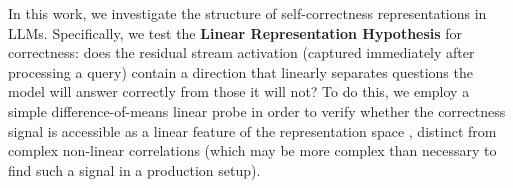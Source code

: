 \documentclass{article} %
\begin{document}
In this work, we investigate the structure of self-correctness representations in LLMs. Specifically, we test the \textbf{Linear Representation Hypothesis} for correctness: does the residual stream activation (captured immediately after processing a query) contain a direction that linearly separates questions the model will answer correctly from those it will not? To do this, we employ a simple difference-of-means linear probe in order to verify whether the correctness signal is accessible as a linear feature of the representation space \citep{park2024linearrepresentationhypothesisgeometry}, distinct from complex non-linear correlations (which may be more complex than necessary to find such a signal in a production setup).

\end{document}
